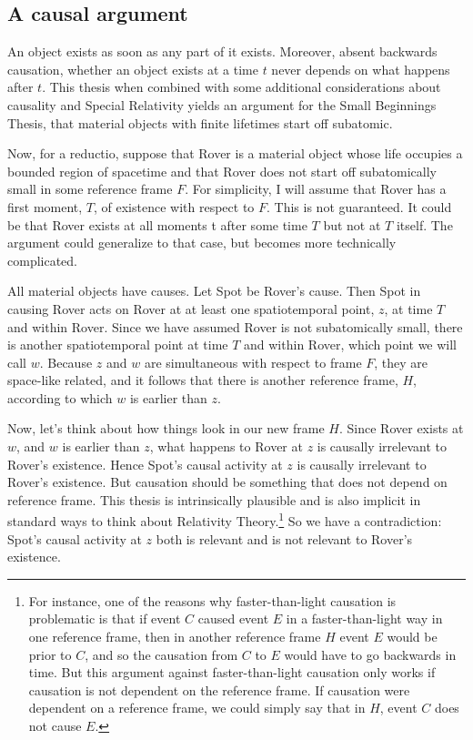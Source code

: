 \subsection{A causal argument}
An object exists as soon as any part of it exists. Moreover, absent backwards causation, whether an object exists at a time $t$ never depends on what happens after $t$. This thesis when combined with some additional considerations about causality and Special Relativity yields an argument for the Small Beginnings Thesis, that material objects with finite lifetimes start off subatomic. 

Now, for a reductio, suppose that Rover is a material object whose life occupies a bounded region of spacetime and that Rover does not start off subatomically small in some reference frame $F$. For simplicity, I will assume that Rover has a first moment, $T$, of existence with respect to $F$. This is not guaranteed. It could be that Rover exists at all moments t after some time $T$ but not at $T$ itself. The argument could generalize to that case, but becomes more technically complicated.

All material objects have causes. Let Spot be Rover's cause. Then Spot in causing Rover acts on Rover at at least one spatiotemporal point, $z$, at time $T$ and within Rover. Since we have assumed Rover is not subatomically small, there is another spatiotemporal point at time $T$ and within Rover, which point we will call $w$. Because $z$ and $w$ are simultaneous with respect to frame $F$, they are space-like related, and it follows that there is another reference frame, $H$, according to which $w$ is earlier than $z$. 

Now, let's think about how things look in our new frame $H$. Since Rover exists at $w$, and $w$ is earlier than $z$, what happens to Rover at $z$ is causally irrelevant to Rover's existence. Hence Spot's causal activity at $z$ is causally irrelevant to Rover's existence. But causation should be something that does not depend on reference frame. This thesis is intrinsically plausible and is also implicit in standard ways to think about Relativity Theory.\footnote{For instance, one of the reasons why faster-than-light causation is problematic is that if event $C$ caused event $E$ in a faster-than-light way in one reference frame, then in another reference frame $H$ event $E$ would be prior to $C$, and so the causation from $C$ to $E$ would have to go backwards in time. But this argument against faster-than-light causation only works if causation is not dependent on the reference frame. If causation were dependent on a reference frame, we could simply say that in $H$, event $C$ does not cause $E$.}  So we have a contradiction: Spot's causal activity at $z$ both is relevant and is not relevant to Rover's existence.
 
